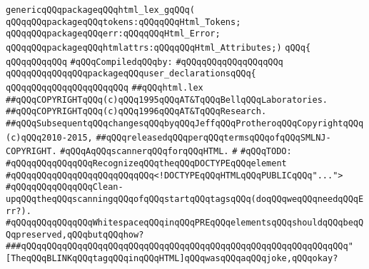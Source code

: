 \label{src/lib/html/html.lex.pkg}
\verb|genericqQQqpackageqQQqhtml_lex_gqQQq(|\newline
\verb|qQQqqQQqpackageqQQqtokens:qQQqqQQqHtml_Tokens;|\newline
\verb|qQQqqQQqpackageqQQqerr:qQQqqQQqHtml_Error;|\newline
\verb|qQQqqQQqpackageqQQqhtmlattrs:qQQqqQQqHtml_Attributes;)|\newline
\verb|qQQq{|\newline
\verb|qQQqqQQqqQQq|\newline
\verb|#qQQqCompiledqQQqby:|\newline
\verb|#qQQqqQQqqQQqqQQqqQQq|\newline
\newline
\verb|qQQqqQQqqQQqqQQqpackageqQQquser_declarationsqQQq{|\newline
\verb|qQQqqQQqqQQqqQQqqQQqqQQq|\newline
\verb|##qQQqhtml.lex|\newline
\verb|##qQQqCOPYRIGHTqQQq(c)qQQq1995qQQqAT&TqQQqBellqQQqLaboratories.|\newline
\verb|##qQQqCOPYRIGHTqQQq(c)qQQq1996qQQqAT&TqQQqResearch.|\newline
\verb|##qQQqSubsequentqQQqchangesqQQqbyqQQqJeffqQQqProtheroqQQqCopyrightqQQq(c)qQQq2010-2015,|\newline
\verb|##qQQqreleasedqQQqperqQQqtermsqQQqofqQQqSMLNJ-COPYRIGHT.|\newline
\newline
\newline
\newline
\verb|#qQQqAqQQqscannerqQQqforqQQqHTML.|\newline
\verb|#|\newline
\verb|#qQQqTODO:|\newline
\verb|#qQQqqQQqqQQqqQQqRecognizeqQQqtheqQQqDOCTYPEqQQqelement|\newline
\verb|#qQQqqQQqqQQqqQQqqQQqqQQqqQQq<!DOCTYPEqQQqHTMLqQQqPUBLICqQQq"...">|\newline
\verb|#qQQqqQQqqQQqqQQqClean-upqQQqtheqQQqscanningqQQqofqQQqstartqQQqtagsqQQq(doqQQqweqQQqneedqQQqErr?).|\newline
\verb|#qQQqqQQqqQQqqQQqWhitespaceqQQqinqQQqPREqQQqelementsqQQqshouldqQQqbeqQQqpreserved,qQQqbutqQQqhow?|\newline
\newline
\newline
\verb|###qQQqqQQqqQQqqQQqqQQqqQQqqQQqqQQqqQQqqQQqqQQqqQQqqQQqqQQqqQQqqQQq"[TheqQQqBLINKqQQqtagqQQqinqQQqHTML]qQQqwasqQQqaqQQqjoke,qQQqokay?|\newline
